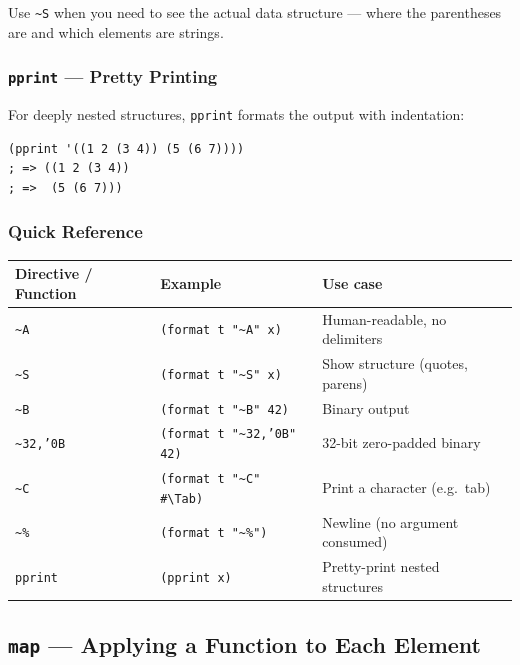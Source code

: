 Use \texttt{\~{}S} when you need to see the actual data structure
--- where the parentheses are and which elements are strings.

\subsubsection{\texttt{pprint} --- Pretty Printing}

For deeply nested structures, \texttt{pprint} formats the output
with indentation:

\begin{lstlisting}
(pprint '((1 2 (3 4)) (5 (6 7))))
; => ((1 2 (3 4))
; =>  (5 (6 7)))
\end{lstlisting}

\subsubsection{Quick Reference}

\begin{center}
\begin{tabular}{llp{5.5cm}}
  \toprule
  \textbf{Directive / Function} & \textbf{Example} & \textbf{Use case} \\
  \midrule
  \texttt{\~{}A}     & \texttt{(format t "\~{}A" x)}  & Human-readable, no delimiters \\
  \texttt{\~{}S}     & \texttt{(format t "\~{}S" x)}  & Show structure (quotes, parens) \\
  \texttt{\~{}B}     & \texttt{(format t "\~{}B" 42)} & Binary output \\
  \texttt{\~{}32,'0B} & \texttt{(format t "\~{}32,'0B" 42)} & 32-bit zero-padded binary \\
  \texttt{\~{}C}     & \texttt{(format t "\~{}C" \#\textbackslash Tab)} & Print a character (e.g.\ tab) \\
  \texttt{\~{}\%}    & \texttt{(format t "\~{}\%")}   & Newline (no argument consumed) \\
  \texttt{pprint}    & \texttt{(pprint x)}            & Pretty-print nested structures \\
  \bottomrule
\end{tabular}
\end{center}

\subsection{\texttt{map} --- Applying a Function to Each Element}

